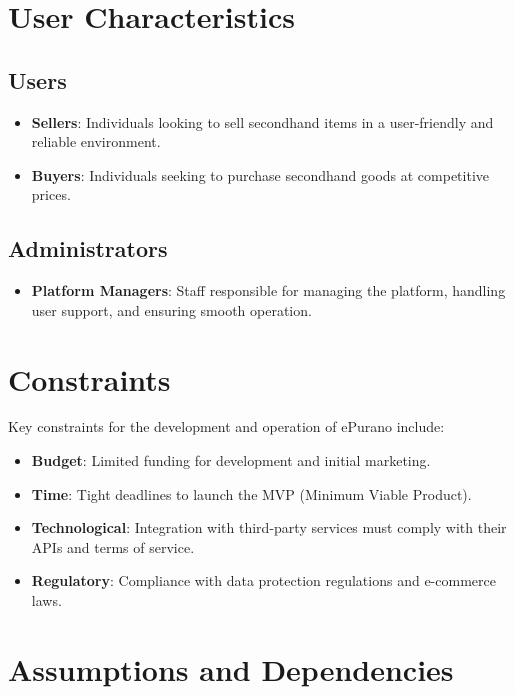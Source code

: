 \section{User Characteristics}

\subsection{Users}

\begin{itemize}
    \item \textbf{Sellers}: Individuals looking to sell secondhand items in a user-friendly and reliable environment.
    \item \textbf{Buyers}: Individuals seeking to purchase secondhand goods at competitive prices.
\end{itemize}

\subsection{Administrators}

\begin{itemize}
    \item \textbf{Platform Managers}: Staff responsible for managing the platform, handling user support, and ensuring smooth operation.
\end{itemize}

\section{Constraints}

Key constraints for the development and operation of ePurano include:

\begin{itemize}
    \item \textbf{Budget}: Limited funding for development and initial marketing.
    \item \textbf{Time}: Tight deadlines to launch the MVP (Minimum Viable Product).
    \item \textbf{Technological}: Integration with third-party services must comply with their APIs and terms of service.
    \item \textbf{Regulatory}: Compliance with data protection regulations and e-commerce laws.
\end{itemize}

\section{Assumptions and Dependencies}

